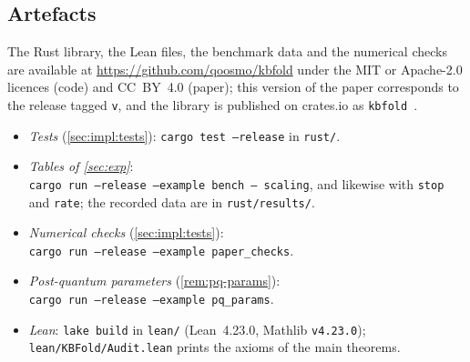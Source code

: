 \subsection{Artefacts}\label{sec:concl:artefacts}
The Rust library, the Lean files, the benchmark data and the numerical checks are available at \url{https://github.com/qoosmo/kbfold} under the MIT or Apache-2.0 licences (code) and CC~BY~4.0 (paper); this version of the paper corresponds to the release tagged \texttt{v\kbversion}, and the library is published on crates.io as \texttt{kbfold}~\kbversion.
\begin{itemize}
  \item \emph{Tests} (\cref{sec:impl:tests}): \texttt{cargo test --release} in \texttt{rust/}.
  \item \emph{Tables of \cref{sec:exp}}:\\ \texttt{cargo run --release --example bench -- scaling}, and likewise with \texttt{stop} and \texttt{rate}; the recorded data are in \texttt{rust/results/}.
  \item \emph{Numerical checks} (\cref{sec:impl:tests}):\\ \texttt{cargo run --release --example paper\_checks}.
  \item \emph{Post-quantum parameters} (\cref{rem:pq-params}):\\ \texttt{cargo run --release --example pq\_params}.
  \item \emph{Lean}: \texttt{lake build} in \texttt{lean/} (Lean~4.23.0, Mathlib \texttt{v4.23.0}); \texttt{lean/KBFold/Audit.lean} prints the axioms of the main theorems.
\end{itemize}
